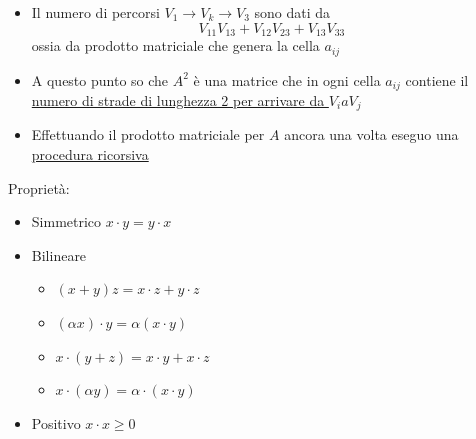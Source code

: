 \documentclass[12pt,a4paper,oneside]{article}
\begin{document}
\begin{itemize}
	      \[
		      \underbrace{\begin{bNiceMatrix}[margin=1pt]
				      \CodeBefore
				      \rowcolor{gray!20}{1}
				      \Body
				      1 & 1 & 0 \\
				      0 & 0 & 2 \\
				      0 & 0 & 0 \\
			      \end{bNiceMatrix}}_{\text{Frecce che partono da } V_1}
		      \underbrace{\begin{bNiceMatrix}[margin=1pt]
				      \CodeBefore
				      \columncolor{gray!20}{3}
				      \Body
				      1 & 1 & 0 \\
				      0 & 0 & 2 \\
				      0 & 0 & 0 \\
			      \end{bNiceMatrix}}_{\text{Frecce che arrivano in }V_3}
		      \rightarrow
		      \begin{bmatrix}  1 \\ 1 \\ 0 \end{bmatrix} \cdot \begin{bmatrix} 0 \\ 2 \\ 0 \end{bmatrix} = \begin{bmatrix} 2 \end{bmatrix}
	      \]
	\item Il numero di percorsi $V_1 \rightarrow V_k \rightarrow V_3$ sono dati da \[
		      V_{11} V_{13} + V_{12} V_{23} + V_{13}V_{33}
	      \]
	      ossia da prodotto matriciale che genera la cella $a_{ij}$
	      \hr
	\item A questo punto so che $A^{2}$ è una matrice che in ogni cella $a_{ij}$ contiene il \underline{numero di strade di lunghezza 2 per arrivare da $V_i a V_j$ }
	\item Effettuando il prodotto matriciale per $A$ ancora una volta eseguo una \underline{procedura ricorsiva}
\end{itemize}

Proprietà:
\begin{itemize}
	\item Simmetrico \quad $x\cdot y = y \cdot x$
	\item Bilineare
	      \begin{itemize}
		      \item $(x+y)z = x \cdot z + y \cdot z$
		      \item $\left( \alpha x  \right) \cdot y = \alpha \left( x \cdot y \right) $
		      \item $x \cdot \left(  y + z \right)  = x \cdot y + x \cdot z$
		      \item $x \cdot \left( \alpha y  \right) = \alpha \cdot \left( x \cdot y \right) $
	      \end{itemize}
	\item Positivo \quad $ x \cdot x \ge 0$
\end{itemize}
\end{document}
